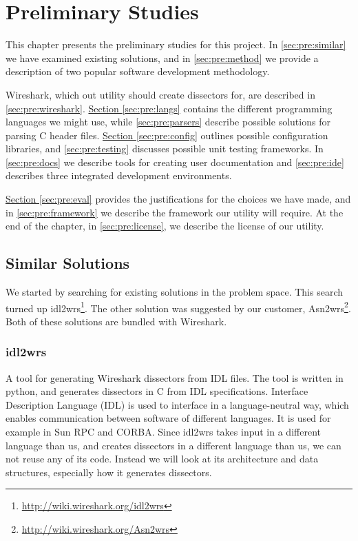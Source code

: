 \chapter{Preliminary Studies}
This chapter presents the preliminary studies for this project.
In \autoref{sec:pre:similar} we have examined existing solutions, and in
\autoref{sec:pre:method} we provide a description of two popular software
development methodology.

Wireshark, which out utility should create dissectors for, are described in
\autoref{sec:pre:wireshark}.
\hyperref[sec:pre:langs]{Section \ref*{sec:pre:langs}} contains the different
programming languages we might use, while \autoref{sec:pre:parsers}
describe possible solutions for parsing C header files.
\hyperref[sec:pre:config]{Section \ref*{sec:pre:config}} outlines possible
configuration libraries, and \autoref{sec:pre:testing} discusses possible unit
testing frameworks. In \autoref{sec:pre:docs} we describe tools for creating
user documentation and \autoref{sec:pre:ide} describes three integrated
development environments.

\hyperref[sec:pre:eval]{Section \ref*{sec:pre:eval}} provides the
justifications for the choices we have made, and in
\autoref{sec:pre:framework} we describe the framework our utility will require.
At the end of the chapter, in \autoref{sec:pre:license}, we describe the
license of our utility.


\section{Similar Solutions}
\label{sec:pre:similar}
We started by searching for existing solutions in the problem space. This
search turned up idl2wrs\footnote{\url{http://wiki.wireshark.org/idl2wrs}}.
The other solution was suggested by our customer,
Asn2wrs\footnote{\url{http://wiki.wireshark.org/Asn2wrs}}.
Both of these solutions are bundled with Wireshark.

\subsection{idl2wrs}
A tool for generating Wireshark dissectors from IDL files. The tool is written
in python, and generates dissectors in C from IDL specifications. Interface
Description Language (IDL) is used to interface in a language-neutral way,
which enables communication between software of different languages. It is
used for example in Sun RPC and CORBA. Since idl2wrs takes input in a different
language than us, and creates dissectors in a different language than us, we
can not reuse any of its code. Instead we will look at its architecture and
data structures, especially how it generates dissectors.

